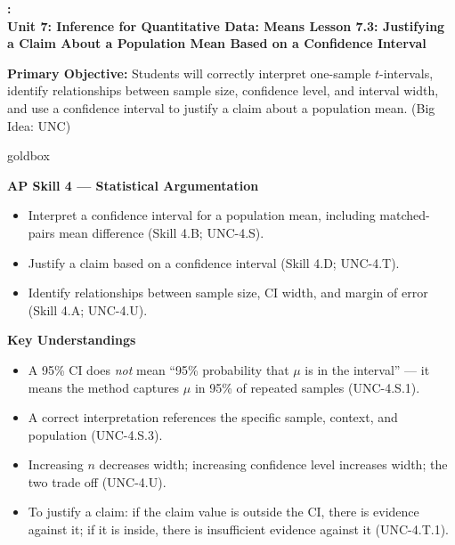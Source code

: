 \documentclass[10pt]{article}
\newcommand{\UnitNumberName}{Unit 7: Inference for Quantitative Data: Means \quad}
\newcommand{\LessonNumberName}{Lesson 7.3: Justifying a Claim About a Population Mean Based on a Confidence Interval}
\begin{document}
\begin{center}
    {\Large\bfseries \CourseName: \SchoolYear \\
    {\small\bfseries \UnitNumberName \LessonNumberName}}
\end{center}

\begin{tcolorbox}[colback=sky, colframe=navy, boxrule=0.9pt, arc=2mm,
    left=2mm, right=2mm, top=1.5mm, bottom=1.5mm]
    \textbf{Primary Objective:} Students will correctly interpret one-sample $t$-intervals,
    identify relationships between sample size, confidence level, and interval width, and
    use a confidence interval to justify a claim about a population mean. (Big Idea: UNC)
\end{tcolorbox}

\renewcommand{\arraystretch}{1.6}
\begin{skillbox}{goldbox}
\begin{minipage}[t]{0.48\linewidth}
    \textbf{AP Skill 4 --- Statistical Argumentation}
    \begin{itemize}
        \item Interpret a confidence interval for a population mean, including
              matched-pairs mean difference (Skill 4.B; UNC-4.S).
        \item Justify a claim based on a confidence interval (Skill 4.D; UNC-4.T).
        \item Identify relationships between sample size, CI width, and margin of
              error (Skill 4.A; UNC-4.U).
    \end{itemize}
\end{minipage}
\hfill
\begin{minipage}[t]{0.48\linewidth}
    \textbf{Key Understandings}
    \begin{itemize}
        \item A 95\% CI does \emph{not} mean ``95\% probability that $\mu$ is in
              the interval'' --- it means the method captures $\mu$ in 95\% of
              repeated samples (UNC-4.S.1).
        \item A correct interpretation references the specific sample, context,
              and population (UNC-4.S.3).
        \item Increasing $n$ decreases width; increasing confidence level increases
              width; the two trade off (UNC-4.U).
        \item To justify a claim: if the claim value is outside the CI, there is
              evidence against it; if it is inside, there is insufficient evidence
              against it (UNC-4.T.1).
    \end{itemize}
\end{minipage}
\end{skillbox}
\end{document}
